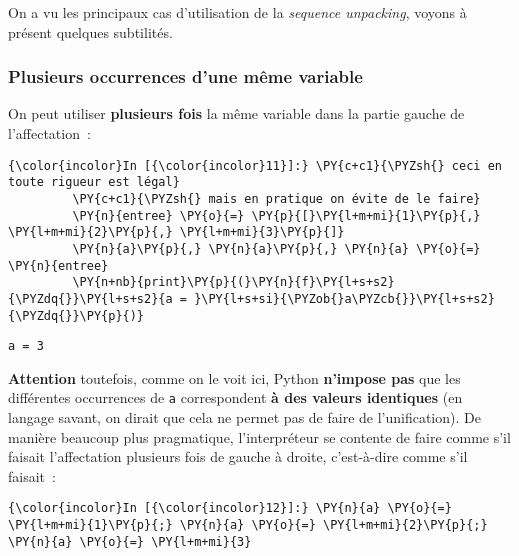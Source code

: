    On a vu les principaux cas d'utilisation de la \emph{sequence
unpacking}, voyons à présent quelques subtilités.

    \hypertarget{plusieurs-occurrences-dune-muxeame-variable}{%
\subsubsection{Plusieurs occurrences d'une même
variable}\label{plusieurs-occurrences-dune-muxeame-variable}}

    On peut utiliser \textbf{plusieurs fois} la même variable dans la partie
gauche de l'affectation~:

    \begin{Verbatim}[commandchars=\\\{\},frame=single,framerule=0.3mm,rulecolor=\color{cellframecolor}]
{\color{incolor}In [{\color{incolor}11}]:} \PY{c+c1}{\PYZsh{} ceci en toute rigueur est légal}
         \PY{c+c1}{\PYZsh{} mais en pratique on évite de le faire}
         \PY{n}{entree} \PY{o}{=} \PY{p}{[}\PY{l+m+mi}{1}\PY{p}{,} \PY{l+m+mi}{2}\PY{p}{,} \PY{l+m+mi}{3}\PY{p}{]}
         \PY{n}{a}\PY{p}{,} \PY{n}{a}\PY{p}{,} \PY{n}{a} \PY{o}{=} \PY{n}{entree}
         \PY{n+nb}{print}\PY{p}{(}\PY{n}{f}\PY{l+s+s2}{\PYZdq{}}\PY{l+s+s2}{a = }\PY{l+s+si}{\PYZob{}a\PYZcb{}}\PY{l+s+s2}{\PYZdq{}}\PY{p}{)}
\end{Verbatim}


    \begin{Verbatim}[commandchars=\\\{\},frame=single,framerule=0.3mm,rulecolor=\color{cellframecolor}]
a = 3
\end{Verbatim}

    \textbf{Attention} toutefois, comme on le voit ici, Python
\textbf{n'impose pas} que les différentes occurrences de \texttt{a}
correspondent \textbf{à des valeurs identiques} (en langage savant, on
dirait que cela ne permet pas de faire de l'unification). De manière
beaucoup plus pragmatique, l'interpréteur se contente de faire comme
s'il faisait l'affectation plusieurs fois de gauche à droite,
c'est-à-dire comme s'il faisait~:

    \begin{Verbatim}[commandchars=\\\{\},frame=single,framerule=0.3mm,rulecolor=\color{cellframecolor}]
{\color{incolor}In [{\color{incolor}12}]:} \PY{n}{a} \PY{o}{=} \PY{l+m+mi}{1}\PY{p}{;} \PY{n}{a} \PY{o}{=} \PY{l+m+mi}{2}\PY{p}{;} \PY{n}{a} \PY{o}{=} \PY{l+m+mi}{3}
\end{Verbatim}



